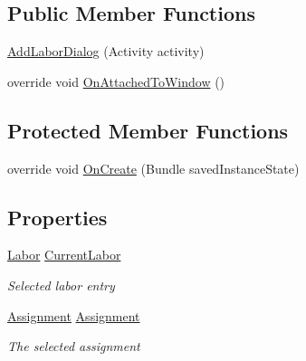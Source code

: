 \subsection*{Public Member Functions}
\begin{DoxyCompactItemize}
\item 
\hyperlink{class_field_service_1_1_android_1_1_dialogs_1_1_add_labor_dialog_a5ff3c74f895fab1bf17701c5e7d72771}{Add\+Labor\+Dialog} (Activity activity)
\item 
override void \hyperlink{class_field_service_1_1_android_1_1_dialogs_1_1_add_labor_dialog_a3221a7720a4650c08834d0dcce39a3cb}{On\+Attached\+To\+Window} ()
\end{DoxyCompactItemize}
\subsection*{Protected Member Functions}
\begin{DoxyCompactItemize}
\item 
override void \hyperlink{class_field_service_1_1_android_1_1_dialogs_1_1_add_labor_dialog_a830f65ae612dd3aa93238beaf935843c}{On\+Create} (Bundle saved\+Instance\+State)
\end{DoxyCompactItemize}
\subsection*{Properties}
\begin{DoxyCompactItemize}
\item 
\hyperlink{class_field_service_1_1_data_1_1_labor}{Labor} \hyperlink{class_field_service_1_1_android_1_1_dialogs_1_1_add_labor_dialog_ae71d142ea9c1d444a703b56cdcb4658b}{Current\+Labor}
\begin{DoxyCompactList}\small\item\em Selected labor entry \end{DoxyCompactList}\item 
\hyperlink{class_field_service_1_1_data_1_1_assignment}{Assignment} \hyperlink{class_field_service_1_1_android_1_1_dialogs_1_1_add_labor_dialog_ad165744da418abc55f4c649365d06791}{Assignment}
\begin{DoxyCompactList}\small\item\em The selected assignment \end{DoxyCompactList}\end{DoxyCompactItemize}


